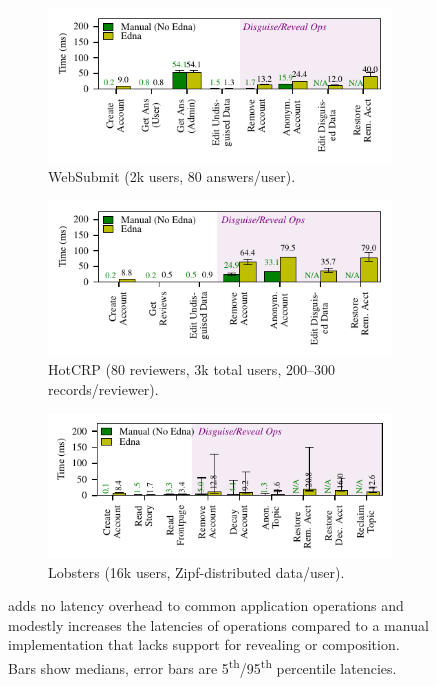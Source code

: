 \begin{figure}
\begin{subfigure}[b]{\columnwidth}
    \centering
  \includegraphics[width=.8\columnwidth]{figs/websubmit_op_stats}
\caption{WebSubmit (2k users, 80 answers/user).}
\label{f:ops-websubmit}
\end{subfigure}
\begin{subfigure}[b]{\columnwidth}
    \centering
    \includegraphics[width=.8\columnwidth]{figs/hotcrp_op_stats}
  \caption{HotCRP (80 reviewers, 3k total users, 200--300 records/reviewer).}
\label{f:ops-hotcrp}
\end{subfigure}
\begin{subfigure}[b]{\columnwidth}
    \centering
    \includegraphics[width=.8\columnwidth]{figs/lobsters_op_stats}
\caption{Lobsters (16k users, Zipf-distributed data/user).}
\label{f:ops-lobsters}
\end{subfigure}
\caption{\sys adds no latency overhead to common application operations and
modestly increases the latencies of \xxing operations compared to a manual
implementation that lacks support for revealing or composition.
%
Bars show medians, error bars are 5\textsuperscript{th}/95\textsuperscript{th}
percentile latencies.}
\label{fig:client_opstats}
\end{figure}

